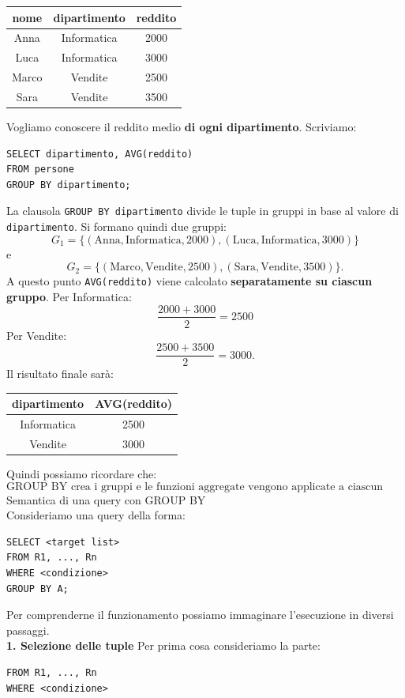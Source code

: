 \begin{center}
\begin{tabular}{|c|c|c|}
\hline
\textbf{nome} & \textbf{dipartimento} & \textbf{reddito} \\ \hline
Anna  & Informatica & 2000 \\ \hline
Luca  & Informatica & 3000 \\ \hline
Marco & Vendite     & 2500 \\ \hline
Sara  & Vendite     & 3500 \\ \hline
\end{tabular}
\end{center}
Vogliamo conoscere il reddito medio \textbf{di ogni dipartimento}.
Scriviamo:
\begin{verbatim}
SELECT dipartimento, AVG(reddito)
FROM persone
GROUP BY dipartimento;
\end{verbatim}
\noindent La clausola \texttt{GROUP BY dipartimento} divide le tuple in gruppi
in base al valore di \texttt{dipartimento}.
Si formano quindi due gruppi:
\[
G_1 =
\{
(\text{Anna},\text{Informatica},2000),
(\text{Luca},\text{Informatica},3000)
\}
\]
e
\[
G_2 =
\{
(\text{Marco},\text{Vendite},2500),
(\text{Sara},\text{Vendite},3500)
\}.
\]
A questo punto \texttt{AVG(reddito)} viene calcolato
\textbf{separatamente su ciascun gruppo}.
Per Informatica:
\[
\frac{2000+3000}{2}=2500
\]
Per Vendite:
\[
\frac{2500+3500}{2}=3000.
\]
Il risultato finale sarà:
\begin{center}
\begin{tabular}{|c|c|}
\hline
\textbf{dipartimento} & \textbf{AVG(reddito)} \\ \hline
Informatica & 2500 \\ \hline
Vendite & 3000 \\ \hline
\end{tabular}
\end{center}
Quindi possiamo ricordare che:
\[
\boxed{\text{GROUP BY crea i gruppi e le funzioni aggregate
vengono applicate a ciascun gruppo}}
\]
\noindent Semantica di una query con GROUP BY\\
Consideriamo una query della forma:
\begin{verbatim}
SELECT <target list>
FROM R1, ..., Rn
WHERE <condizione>
GROUP BY A;
\end{verbatim}
Per comprenderne il funzionamento possiamo immaginare l'esecuzione
in diversi passaggi.\\
\textbf{1. Selezione delle tuple}
Per prima cosa consideriamo la parte:
\begin{verbatim}
FROM R1, ..., Rn
WHERE <condizione>
\end{verbatim}
